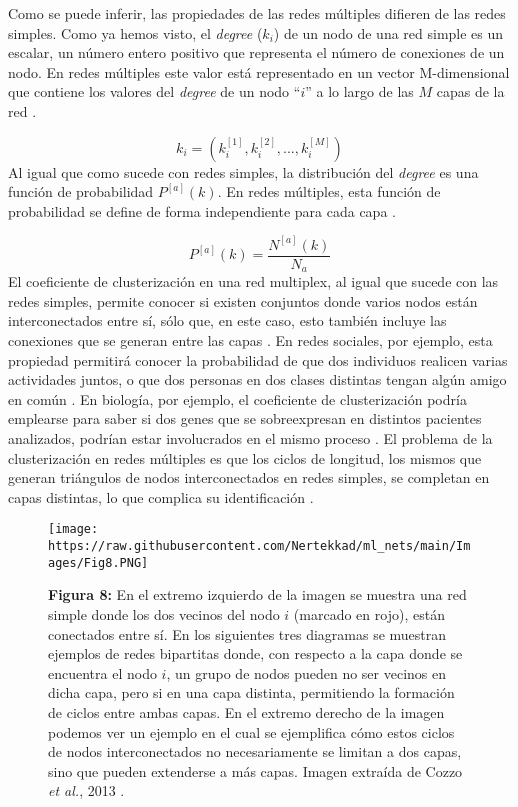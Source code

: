 \documentclass[
]{book}
\begin{document}
Como se puede inferir, las propiedades de las redes múltiples difieren de las redes simples. Como ya hemos visto, el \emph{degree} (\(k_{i}\)) de un nodo de una red simple es un escalar, un número entero positivo que representa el número de conexiones de un nodo. En redes múltiples este valor está representado en un vector M-dimensional que contiene los valores del \emph{degree} de un nodo ``\(i\)'' a lo largo de las \(M\) capas de la red \citep{iacovacci2016functional}.

\[k_{i} = (k_{i}^{[1]}, k_{i}^{[2]},..., k_{i}^{[M]})\]
Al igual que como sucede con redes simples, la distribución del \emph{degree} es una función de probabilidad \(P^{[a]}(k)\). En redes múltiples, esta función de probabilidad se define de forma independiente para cada capa \citep{iacovacci2016functional}.

\[P^{[a]}(k) = \frac{N^{[a]}(k)}{N_{a}}\]
El coeficiente de clusterización en una red multiplex, al igual que sucede con las redes simples, permite conocer si existen conjuntos donde varios nodos están interconectados entre sí, sólo que, en este caso, esto también incluye las conexiones que se generan entre las capas \citep{lancichinetti2012consensus}. En redes sociales, por ejemplo, esta propiedad permitirá conocer la probabilidad de que dos individuos realicen varias actividades juntos, o que dos personas en dos clases distintas tengan algún amigo en común \citep{bianconi2018multilayer}. En biología, por ejemplo, el coeficiente de clusterización podría emplearse para saber si dos genes que se sobreexpresan en distintos pacientes analizados, podrían estar involucrados en el mismo proceso \citep{zuzek2015epidemic}. El problema de la clusterización en redes múltiples es que los ciclos de longitud, los mismos que generan triángulos de nodos interconectados en redes simples, se completan en capas distintas, lo que complica su identificación \citep{lancichinetti2012consensus}.

\begin{figure}
\centering
\texttt{[image: https://raw.githubusercontent.com/Nertekkad/ml\_nets/main/Images/Fig8.PNG]}
\caption{\textbf{Figura 8:} En el extremo izquierdo de la imagen se muestra una red simple donde los dos vecinos del nodo \(i\) (marcado en rojo), están conectados entre sí. En los siguientes tres diagramas se muestran ejemplos de redes bipartitas donde, con respecto a la capa donde se encuentra el nodo \(i\), un grupo de nodos pueden no ser vecinos en dicha capa, pero si en una capa distinta, permitiendo la formación de ciclos entre ambas capas. En el extremo derecho de la imagen podemos ver un ejemplo en el cual se ejemplifica cómo estos ciclos de nodos interconectados no necesariamente se limitan a dos capas, sino que pueden extenderse a más capas. Imagen extraída de Cozzo \emph{et al.}, 2013 \citep{cozzo2013clustering}.}
\end{figure}
\end{document}
